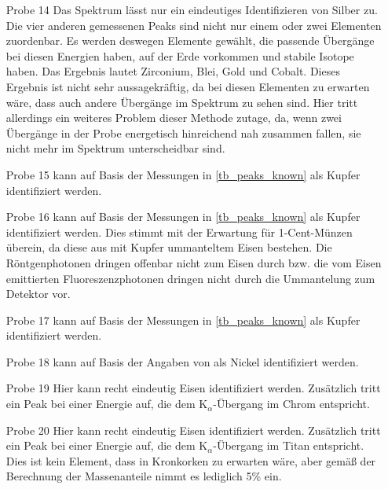 \documentclass[
	a4paper,
	12pt,
	pagesize,
	ngerman
]{scrartcl}
\begin{document}
\begin{enumerate}
		\item[Probe 14] Das Spektrum lässt nur ein eindeutiges Identifizieren von Silber zu. Die vier anderen gemessenen Peaks sind nicht nur einem oder zwei Elementen zuordenbar. Es werden deswegen Elemente gewählt, die passende Übergänge bei diesen Energien haben, auf der Erde vorkommen und stabile Isotope haben. Das Ergebnis lautet Zirconium, Blei, Gold und Cobalt. Dieses Ergebnis ist nicht sehr aussagekräftig, da bei diesen Elementen zu erwarten wäre, dass auch andere Übergänge im Spektrum zu sehen sind. Hier tritt allerdings ein weiteres Problem dieser Methode zutage, da, wenn zwei Übergänge in der Probe energetisch hinreichend nah zusammen fallen, sie nicht mehr im Spektrum unterscheidbar sind.
		\item[Probe 15] kann auf Basis der Messungen in \cref{tb_peaks_known} als Kupfer identifiziert werden.
		\item[Probe 16] kann auf Basis der Messungen in \cref{tb_peaks_known} als Kupfer identifiziert werden. Dies stimmt mit der Erwartung für 1-Cent-Münzen überein, da diese aus mit Kupfer ummanteltem Eisen bestehen. Die Röntgenphotonen dringen offenbar nicht zum Eisen durch bzw. die vom Eisen emittierten Fluoreszenzphotonen dringen nicht durch die Ummantelung zum Detektor vor.
		\item[Probe 17] kann auf Basis der Messungen in \cref{tb_peaks_known} als Kupfer identifiziert werden.
		\item[Probe 18] kann auf Basis der Angaben von \cite{XRAYDB} als Nickel identifiziert werden.
		\item[Probe 19] Hier kann recht eindeutig Eisen identifiziert werden. Zusätzlich tritt ein Peak bei einer Energie auf, die dem $\text{K}_\alpha$-Übergang im Chrom entspricht.
		\item[Probe 20] Hier kann recht eindeutig Eisen identifiziert werden. Zusätzlich tritt ein Peak bei einer Energie auf, die dem $\text{K}_\alpha$-Übergang im Titan entspricht. Dies ist kein Element, dass in Kronkorken zu erwarten wäre, aber gemäß der Berechnung der Massenanteile nimmt es lediglich 5\% ein.
	\end{enumerate}
	
\end{document}
